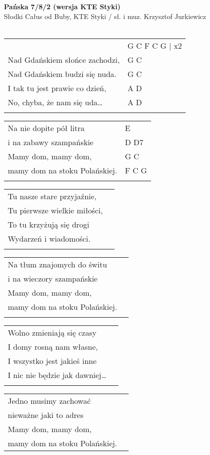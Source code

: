\documentclass[a5paper]{article}
\begin{document}


\noindent
\fontsize{12pt}{15pt}\selectfont
\textbf{Pańska 7/8/2 (wersja KTE Styki)} \\
\fontsize{8pt}{10pt}\selectfont
Słodki Całus od Buby, KTE Styki / sł. i muz. Krzysztof Jurkiewicz \\ \\
\fontsize{10pt}{12pt}\selectfont
{}
\begin{tabular}{@{}p{7.50cm}p{3cm}@{}}
\noindent
& G C  F C G | x2 \\
Nad Gdańskiem słońce zachodzi, & G C \\
Nad Gdańskiem budzi się nuda. & G C \\
I tak tu jest prawie co dzień, & A D \\
No, chyba, że nam się uda… & A D \\ \\
\end{tabular}

\noindent
\begin{tabular}{@{}p{6.50cm}p{3cm}@{}}
	Na nie dopite pół litra & E \\
	i na zabawy szampańskie & D D7 \\
	Mamy dom, mamy dom, & G C \\
	mamy dom na stoku Polańskiej. & F C G \\ \\
\end{tabular}

\noindent
\begin{tabular}{@{}p{6.10cm}p{3cm}@{}}
Tu nasze stare przyjaźnie, \\
Tu pierwsze wielkie miłości, \\
To tu krzyżują się drogi \\
Wydarzeń i wiadomości. \\ \\
\end{tabular}

\noindent
\begin{tabular}{@{}p{6.60cm}p{3cm}@{}}
Na tłum znajomych do świtu \\
i na wieczory szampańskie \\
Mamy dom, mamy dom, \\
mamy dom na stoku Polańskiej. \\ \\
\end{tabular}

\noindent
\begin{tabular}{@{}p{6.10cm}p{3cm}@{}}
Wolno zmieniają się czasy \\
I domy rosną nam własne, \\
I wszystko jest jakieś inne \\
I nic nie będzie jak dawniej… \\ \\
\end{tabular}

\noindent
\begin{tabular}{@{}p{6.60cm}p{3cm}@{}}
Jedno musimy zachować \\
nieważne jaki to adres \\
Mamy dom, mamy dom, \\
mamy dom na stoku Polańskiej.
\end{tabular}
\end{document}
